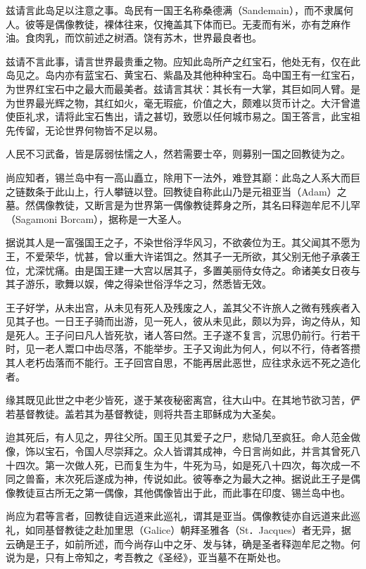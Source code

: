 \documentclass[12pt,UTF8]{ctexbook}
\begin{document}
兹请言此岛足以注意之事。岛民有一国王名称桑德满（Sandemain），而不隶属何人。彼等是偶像教徒，裸体往来，仅掩盖其下体而已。无麦而有米，亦有芝麻作油。食肉乳，而饮前述之树酒。饶有苏木，世界最良者也。

兹请不言此事，请言世界最贵重之物。应知此岛所产之红宝石，他处无有，仅在此岛见之。岛内亦有蓝宝石、黄宝石、紫晶及其他种种宝石。岛中国王有一红宝石，为世界红宝石中之最大而最美者。兹请言其状：其长有一大掌，其巨如同人臂。是为世界最光辉之物，其红如火，毫无瑕疵，价值之大，颇难以货币计之。大汗曾遣使臣礼求，请将此宝石售出，请之甚切，致愿以任何城市易之。国王答言，此宝祖先传留，无论世界何物皆不足以易。

人民不习武备，皆是孱弱怯懦之人，然若需要士卒，则募别一国之回教徒为之。

尚应知者，锡兰岛中有一高山矗立，除用下一法外，难登其巅：此岛之人系大而巨之链数条于此山上，行人攀链以登。回教徒自称此山乃是元祖亚当（Adam）之墓。然偶像教徒，又断言是为世界第一偶像教徒葬身之所，其名曰释迦牟尼不儿罕（Sagamoni Borcam），据称是一大圣人。

据说其人是一富强国王之子，不染世俗浮华风习，不欲袭位为王。其父闻其不愿为王，不爱荣华，忧甚，曾以重大许诺饵之。然其子一无所欲，其父别无他子承袭王位，尤深忧痛。由是国王建一大宫以居其子，多置美丽侍女侍之。命诸美女日夜与其子游乐，歌舞以娱，俾之得染世俗浮华之习，然悉皆无效。

王子好学，从未出宫，从未见有死人及残废之人，盖其父不许旅人之微有残疾者入见其子也。一日王子骑而出游，见一死人，彼从未见此，颇以为异，询之侍从，知是死人。王子问曰凡人皆死欤，诸人答曰然。王子遂不复言，沉思仍前行。行若干时，见一老人鬻口中齿尽落，不能举步。王子又询此为何人，何以不行，侍者答攒其人老朽齿落而不能行。王子回宫自思，不能再居此恶世，应往求永远不死之造化者。

缘其既见此世之中老少皆死，遂于某夜秘密离宫，往大山中。在其地节欲习苦，俨若基督教徒。盖若其为基督教徒，则将共吾主耶稣成为大圣矣。

迨其死后，有人见之，畀往父所。国王见其爱子之尸，悲恸几至疯狂。命人范金做像，饰以宝石，令国人尽崇拜之。众人皆谓其成神，今日言尚如此，并言其曾死八十四次。第一次做人死，已而复生为牛，牛死为马，如是死八十四次，每次成一不同之兽畜，末次死后遂成为神，传说如此。彼等奉之为最大之神。据说此王子是偶像教徒亘古所无之第一偶像，其他偶像皆出于此，而此事在印度、锡兰岛中也。

尚应为君等言者，回教徒自远道来此巡礼，谓其是亚当。偶像教徒亦自远道来此巡礼，如同基督教徒之赴加里思（Galice）朝拜圣雅各（St．Jacques）者无异，据云确是王子，如前所述，而今尚存山中之牙、发与钵，确是圣者释迦牟尼之物。何说为是，只有上帝知之，考吾教之《圣经》，亚当墓不在斯处也。
\end{document}
